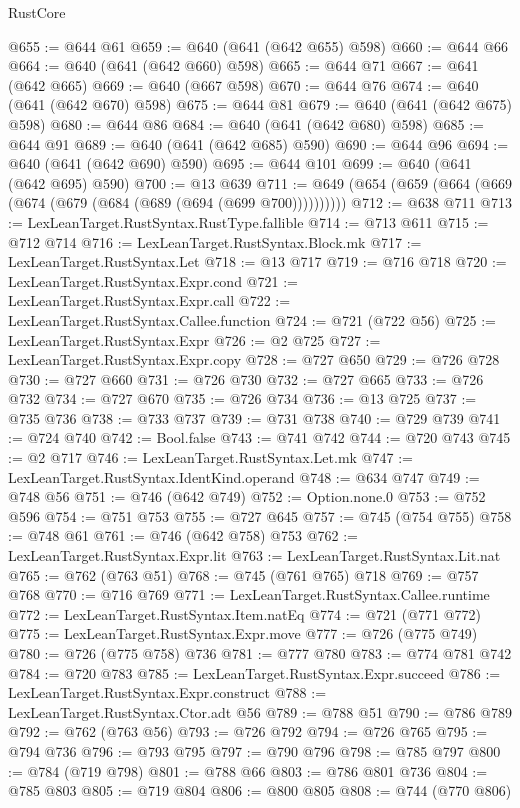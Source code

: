 \begin{lexlean}{RustCore}
\begin{coremodule}
@655 := @644 @61
@659 := @640 (@641 (@642 @655) @598)
@660 := @644 @66
@664 := @640 (@641 (@642 @660) @598)
@665 := @644 @71
@667 := @641 (@642 @665)
@669 := @640 (@667 @598)
@670 := @644 @76
@674 := @640 (@641 (@642 @670) @598)
@675 := @644 @81
@679 := @640 (@641 (@642 @675) @598)
@680 := @644 @86
@684 := @640 (@641 (@642 @680) @598)
@685 := @644 @91
@689 := @640 (@641 (@642 @685) @590)
@690 := @644 @96
@694 := @640 (@641 (@642 @690) @590)
@695 := @644 @101
@699 := @640 (@641 (@642 @695) @590)
@700 := @13 @639
@711 := @649 (@654 (@659 (@664 (@669 (@674 (@679 (@684 (@689 (@694 (@699 @700))))))))))
@712 := @638 @711
@713 := LexLeanTarget.RustSyntax.RustType.fallible
@714 := @713 @611
@715 := @712 @714
@716 := LexLeanTarget.RustSyntax.Block.mk
@717 := LexLeanTarget.RustSyntax.Let
@718 := @13 @717
@719 := @716 @718
@720 := LexLeanTarget.RustSyntax.Expr.cond
@721 := LexLeanTarget.RustSyntax.Expr.call
@722 := LexLeanTarget.RustSyntax.Callee.function
@724 := @721 (@722 @56)
@725 := LexLeanTarget.RustSyntax.Expr
@726 := @2 @725
@727 := LexLeanTarget.RustSyntax.Expr.copy
@728 := @727 @650
@729 := @726 @728
@730 := @727 @660
@731 := @726 @730
@732 := @727 @665
@733 := @726 @732
@734 := @727 @670
@735 := @726 @734
@736 := @13 @725
@737 := @735 @736
@738 := @733 @737
@739 := @731 @738
@740 := @729 @739
@741 := @724 @740
@742 := Bool.false
@743 := @741 @742
@744 := @720 @743
@745 := @2 @717
@746 := LexLeanTarget.RustSyntax.Let.mk
@747 := LexLeanTarget.RustSyntax.IdentKind.operand
@748 := @634 @747
@749 := @748 @56
@751 := @746 (@642 @749)
@752 := Option.none.{0}
@753 := @752 @596
@754 := @751 @753
@755 := @727 @645
@757 := @745 (@754 @755)
@758 := @748 @61
@761 := @746 (@642 @758) @753
@762 := LexLeanTarget.RustSyntax.Expr.lit
@763 := LexLeanTarget.RustSyntax.Lit.nat
@765 := @762 (@763 @51)
@768 := @745 (@761 @765) @718
@769 := @757 @768
@770 := @716 @769
@771 := LexLeanTarget.RustSyntax.Callee.runtime
@772 := LexLeanTarget.RustSyntax.Item.natEq
@774 := @721 (@771 @772)
@775 := LexLeanTarget.RustSyntax.Expr.move
@777 := @726 (@775 @749)
@780 := @726 (@775 @758) @736
@781 := @777 @780
@783 := @774 @781 @742
@784 := @720 @783
@785 := LexLeanTarget.RustSyntax.Expr.succeed
@786 := LexLeanTarget.RustSyntax.Expr.construct
@788 := LexLeanTarget.RustSyntax.Ctor.adt @56
@789 := @788 @51
@790 := @786 @789
@792 := @762 (@763 @56)
@793 := @726 @792
@794 := @726 @765
@795 := @794 @736
@796 := @793 @795
@797 := @790 @796
@798 := @785 @797
@800 := @784 (@719 @798)
@801 := @788 @66
@803 := @786 @801 @736
@804 := @785 @803
@805 := @719 @804
@806 := @800 @805
@808 := @744 (@770 @806)

\end{coremodule}
\end{lexlean}
